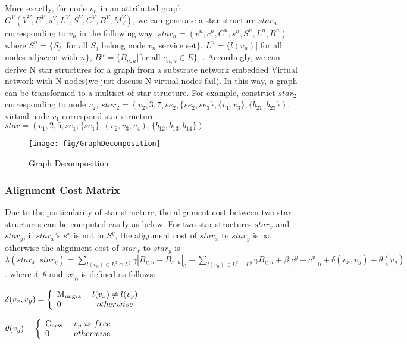 More exactly, for node $v_n$ in an attributed graph  $G^V (V^V,E^V,s^V,L^V,S^V,C^V,B^V,M^V_V)$, we can generate a star structure $star_n$ corresponding to $v_n$ in the following way: $star_n=(v^n,c^n,C^n,s^n,S^n,L^n,B^n)$ where $S^n=\{S_{j}|$ for all $S_j$ belong node $v_n$ service set$\}$.  $L^n=\{l(v_u)|$ for all nodes  adjacent with $n\}$, $B^n=\{B_{n,u}| $for all $e_{n,u}\in E\}$, . Accordingly, we can derive N star structures for a graph from a substrate network embedded Virtual network with N nodes(we just discuss N virtual nodes fail). In this way, a graph can be transformed to a multiset of star structure. For example, construct $star_2$ corresponding to node $v_2$, $star_2=(v_2,3,7,se_2,\{se_2,se_3\},\{v_1,v_3\},\{b_{21},b_{23}\})$, virtual node $v_1$ correspond star structure $star=(v_1,2,5,se_1,\{se_1\},(v_2,v_3,v_4),\{b_{12},b_{13},b_{14}\})$
\begin{figure}
\centering
\texttt{[image: fig/GraphDecomposition]}\\
\caption{Graph Decomposition}\label{fig:GraphDecomposition}
\end{figure}
\subsubsection{Alignment Cost Matrix}


Due to the particularity of star structure, the alignment cost between two star structures can be computed easily as below. For two star structures $star_x$ and $star_y$, if $star_x$'s $s^x$ is not in $S^y$, the alignment cost of $star_x$ to $star_y$ is $\infty$, otherwise the alignment cost of $star_x$ to $star_y$ is $\lambda(star_x,star_y)=\sum\limits_{l(v_u)\in L^x \cap L^y}\gamma|B_{y,u}-B_{x,u}|_0+\sum\limits_{l(v_u)\in L^x - L^y}\gamma B_{y,u}+\beta|c^y-c^x|_0+ \delta(v_x,v_y)+\theta(v_y)$. where $\delta$, $\theta$ and $|x|_0$ is defined as follows:

$\delta ({v_x},{v_y}) = \left\{ \begin{array}{l}
{\rm{M_{migra}}}\\
0
\end{array} \right.\begin{array}{*{20}{c}}
l(v_x)\neq l(v_y)\\
{otherwise}
\end{array}$

$\theta ({v_y}) = \left\{ \begin{array}{l}
{\rm{C_{new}}}\\
0
\end{array} \right.\begin{array}{*{20}{c}}
v_y\ is\ free\\
{otherwise}
\end{array}$

